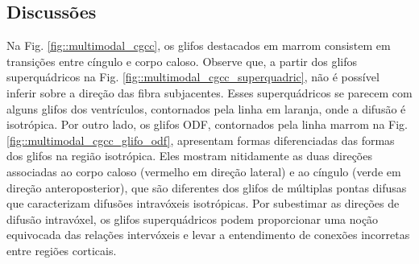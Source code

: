 

\subsection{Discussões}
\label{ssec::visual_discussoes}



Na Fig. \ref{fig::multimodal_cgcc}, os glifos destacados em marrom consistem em transições entre cíngulo e corpo caloso. Observe que, a partir dos glifos superquádricos na Fig. \ref{fig::multimodal_cgcc_superquadric}, não é possível inferir sobre a direção das fibra subjacentes. Esses superquádricos se parecem com alguns glifos dos ventrículos, contornados pela linha em laranja, onde a difusão é isotrópica. Por outro lado, os glifos ODF, contornados pela linha marrom na Fig. \ref{fig::multimodal_cgcc_glifo_odf}, apresentam formas diferenciadas das formas dos glifos na região isotrópica. Eles mostram nitidamente as duas direções associadas ao corpo caloso (vermelho em direção lateral) e ao cíngulo (verde em direção anteroposterior), que são diferentes dos glifos de múltiplas pontas difusas que caracterizam difusões intravóxeis isotrópicas. Por subestimar as direções de difusão intravóxel, os glifos superquádricos podem proporcionar uma noção equivocada das relações intervóxeis e levar a entendimento de conexões incorretas entre regiões corticais.%


